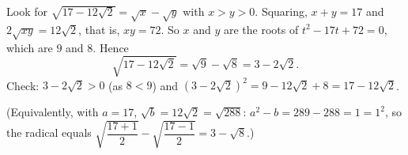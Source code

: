 Look for $\sqrt{17-12\sqrt2}=\sqrt x-\sqrt y$ with $x>y>0$. Squaring, $x+y=17$ and $2\sqrt{xy}=12\sqrt2$, that is, $xy=72$. So $x$ and $y$ are the roots of $t^2-17t+72=0$, which are $9$ and $8$. Hence
\[\sqrt{17-12\sqrt2}=\sqrt9-\sqrt8=\boxed{3-2\sqrt2}.\]
Check: $3-2\sqrt2>0$ (as $8<9$) and $\left(3-2\sqrt2\right)^2=9-12\sqrt2+8=17-12\sqrt2$.

(Equivalently, with $a=17$, $\sqrt b=12\sqrt2=\sqrt{288}$: $a^2-b=289-288=1=1^2$, so the radical equals $\sqrt{\dfrac{17+1}2}-\sqrt{\dfrac{17-1}2}=3-\sqrt8$.)
